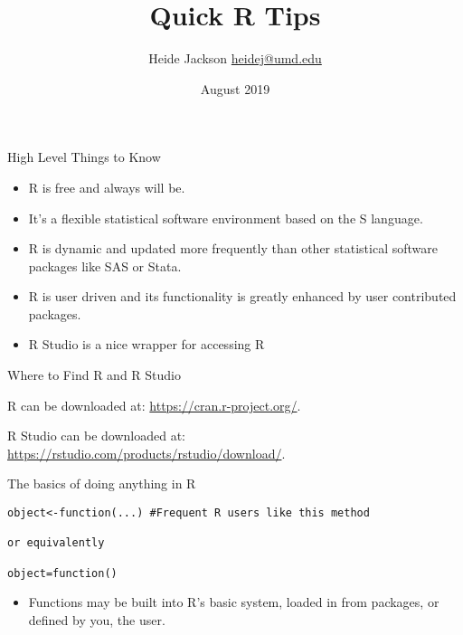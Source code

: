\documentclass{beamer}
\title{Quick R Tips}
\author{\texorpdfstring{Heide Jackson \newline\url{heidej@umd.edu}}{Author}}
\institute{University of Maryland Population Research Center}
\date{August 2019}
\begin{document}
\maketitle
\begin{frame}{High Level Things to Know}
\begin{itemize}
\item R is free and always will be.
\item It's a flexible statistical software environment based on the S language.
\item R is dynamic and updated more frequently than other statistical software packages like SAS or Stata.
\item R is user driven and its functionality is greatly enhanced by user contributed packages.
\item R Studio is a nice wrapper for accessing R
\end{itemize}
\end{frame}


\begin{frame}{Where to Find R and R Studio}

\item R can be downloaded at: \url{https://cran.r-project.org/}.

\item R Studio can be downloaded at: \url{https://rstudio.com/products/rstudio/download/}.

\end{frame}

\begin{frame}[fragile]{The basics of doing anything in R}
\begin{verbatim}
object<-function(...) #Frequent R users like this method

or equivalently

object=function()
\end{verbatim}
\begin{itemize}
    \item Functions may be built into R's basic system, loaded in from packages, or defined by you, the user.
\end{itemize}
\end{frame}
\end{document}
